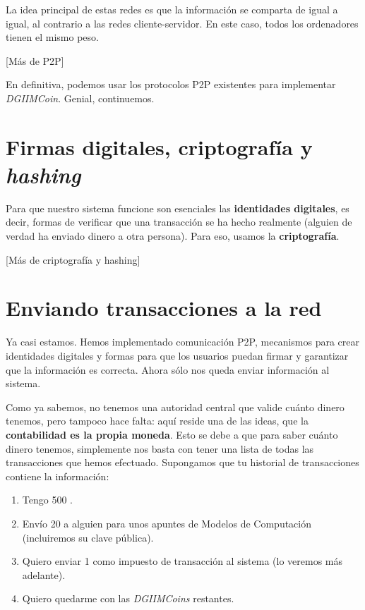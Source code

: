 \documentclass[10pt, a4paper]{article}
\newcommand\dout{\bgroup \markoverwith{\rule[0.2ex]{0.1pt}{0.4pt}\rule[0.8ex]{0.1pt}{0.4pt}}\ULon}
\def\dout{\bgroup
 \markoverwith{\lower-0.35ex\hbox
 {\kern-.03em\vbox{\hrule width.2em\kern0.45ex\hrule}\kern-.03em}}%
 \ULon}
\theoremstyle{theorem-style}
\theoremstyle{theorem-style}
\theoremstyle{definition-style}
\theoremstyle{remark-style}
\theoremstyle{example-style}
\theoremstyle{definition-style}
\theoremstyle{remark-style}
\begin{document}
La idea principal de estas redes es que la información se comparta de
igual a igual, al contrario a las redes cliente-servidor. En este caso,
todos los ordenadores tienen el mismo peso.

{[}Más de P2P{]}

En definitiva, podemos usar los protocolos P2P existentes para
implementar \emph{DGIIMCoin}. Genial, continuemos.

\section{Firmas digitales, criptografía y
\emph{hashing}}\label{firmas-digitales-criptografuxeda-y-hashing}

Para que nuestro sistema funcione son esenciales las \textbf{identidades
digitales}, es decir, formas de verificar que una transacción se ha
hecho realmente (alguien de verdad ha enviado dinero a otra persona).
Para eso, usamos la \textbf{criptografía}.

{[}Más de criptografía y hashing{]}

\section{Enviando transacciones a la
red}\label{enviando-transacciones-a-la-red}

Ya casi estamos. Hemos implementado comunicación P2P, mecanismos para
crear identidades digitales y formas para que los usuarios puedan firmar
y garantizar que la información es correcta. Ahora sólo nos queda enviar
información al sistema.

Como ya sabemos, no tenemos una autoridad central que valide cuánto
dinero tenemos, pero tampoco hace falta: aquí reside una de las ideas,
que la \textbf{contabilidad es la propia moneda}. Esto se debe a que
para saber cuánto dinero tenemos, simplemente nos basta con tener una
lista de todas las transacciones que hemos efectuado. Supongamos que tu
historial de transacciones contiene la información:

\begin{enumerate}
\def\labelenumi{\arabic{enumi}.}
\itemsep1pt\parskip0pt
\item
  Tengo 500 \dout{D}.
\item
  Envío 20 \dout{D} a alguien para unos apuntes de Modelos de
  Computación (incluiremos su clave pública).
\item
  Quiero enviar 1 \dout{D} como impuesto de transacción al sistema (lo
  veremos más adelante).
\item
  Quiero quedarme con las \emph{DGIIMCoins} restantes.
\end{enumerate}
\end{document}

